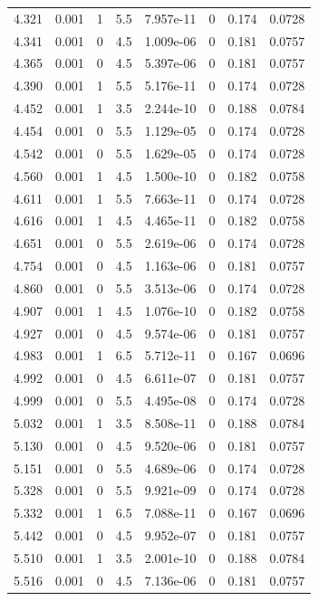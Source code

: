 \documentclass[preview]{standalone}
\begin{document}
{{{\begin{tabular}{L{1.2cm}C{1.2cm} C{0.3cm}C{0.5cm} C{1.4cm}C{1.4cm} C{1.4cm}C{1.4cm}}
  4.321  &  0.001  & 1     & 5.5 &  7.957e-11  & 0  & 0.174 &  0.0728   \\ 
  4.341  &  0.001  & 0     & 4.5 &  1.009e-06  & 0  & 0.181 &  0.0757   \\ 
  4.365  &  0.001  & 0     & 4.5 &  5.397e-06  & 0  & 0.181 &  0.0757   \\ 
  4.390  &  0.001  & 1     & 5.5 &  5.176e-11  & 0  & 0.174 &  0.0728   \\ 
  4.452  &  0.001  & 1     & 3.5 &  2.244e-10  & 0  & 0.188 &  0.0784   \\ 
  4.454  &  0.001  & 0     & 5.5 &  1.129e-05  & 0  & 0.174 &  0.0728   \\ 
  4.542  &  0.001  & 0     & 5.5 &  1.629e-05  & 0  & 0.174 &  0.0728   \\ 
  4.560  &  0.001  & 1     & 4.5 &  1.500e-10  & 0  & 0.182 &  0.0758   \\ 
  4.611  &  0.001  & 1     & 5.5 &  7.663e-11  & 0  & 0.174 &  0.0728   \\ 
  4.616  &  0.001  & 1     & 4.5 &  4.465e-11  & 0  & 0.182 &  0.0758   \\ 
  4.651  &  0.001  & 0     & 5.5 &  2.619e-06  & 0  & 0.174 &  0.0728   \\ 
  4.754  &  0.001  & 0     & 4.5 &  1.163e-06  & 0  & 0.181 &  0.0757   \\ 
  4.860  &  0.001  & 0     & 5.5 &  3.513e-06  & 0  & 0.174 &  0.0728   \\ 
  4.907  &  0.001  & 1     & 4.5 &  1.076e-10  & 0  & 0.182 &  0.0758   \\ 
  4.927  &  0.001  & 0     & 4.5 &  9.574e-06  & 0  & 0.181 &  0.0757   \\ 
  4.983  &  0.001  & 1     & 6.5 &  5.712e-11  & 0  & 0.167 &  0.0696   \\ 
  4.992  &  0.001  & 0     & 4.5 &  6.611e-07  & 0  & 0.181 &  0.0757   \\ 
  4.999  &  0.001  & 0     & 5.5 &  4.495e-08  & 0  & 0.174 &  0.0728   \\ 
  5.032  &  0.001  & 1     & 3.5 &  8.508e-11  & 0  & 0.188 &  0.0784   \\ 
  5.130  &  0.001  & 0     & 4.5 &  9.520e-06  & 0  & 0.181 &  0.0757   \\ 
  5.151  &  0.001  & 0     & 5.5 &  4.689e-06  & 0  & 0.174 &  0.0728   \\ 
  5.328  &  0.001  & 0     & 5.5 &  9.921e-09  & 0  & 0.174 &  0.0728   \\ 
  5.332  &  0.001  & 1     & 6.5 &  7.088e-11  & 0  & 0.167 &  0.0696   \\ 
  5.442  &  0.001  & 0     & 4.5 &  9.952e-07  & 0  & 0.181 &  0.0757   \\ 
  5.510  &  0.001  & 1     & 3.5 &  2.001e-10  & 0  & 0.188 &  0.0784   \\ 
  5.516  &  0.001  & 0     & 4.5 &  7.136e-06  & 0  & 0.181 &  0.0757   \\ 
\hline 
\end{tabular} 

}}}
\end{document}
